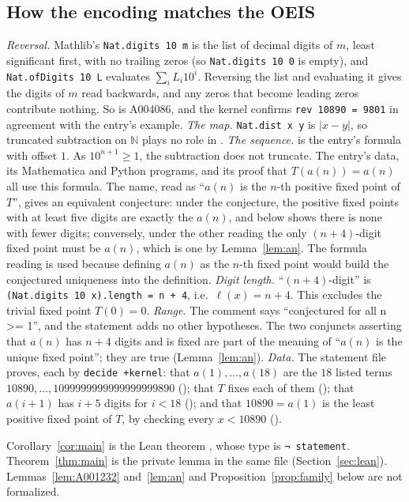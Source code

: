 \documentclass[11pt]{amsart}
\theoremstyle{plain}
\theoremstyle{definition}
\newcommand{\N}{\mathbb{N}}
\newcommand{\len}{\ell}
\begin{document}
\subsection{How the encoding matches the OEIS}
\emph{Reversal.} Mathlib's \texttt{Nat.digits 10 m} is the list of decimal digits of $m$, least significant first, with no trailing zeros (so \texttt{Nat.digits 10 0} is empty), and \texttt{Nat.ofDigits 10 L} evaluates $\sum_i L_i10^i$. Reversing the list and evaluating it gives the digits of $m$ read backwards, and any zeros that become leading zeros contribute nothing. So  is A004086, and the kernel confirms \texttt{rev 10890 = 9801} in agreement with the entry's example.
\emph{The map.} \texttt{Nat.dist x y} is $|x-y|$, so truncated subtraction on $\N$ plays no role in .
\emph{The sequence.}  is the entry's formula with offset $1$. As $10^{n+1}\ge1$, the subtraction does not truncate. The entry's data, its Mathematica and Python programs, and its proof that $T(a(n))=a(n)$ all use this formula. The name, read as ``$a(n)$ is the $n$-th positive fixed point of $T$'', gives an equivalent conjecture: under the conjecture, the positive fixed points with at least five digits are exactly the $a(n)$, and  below shows there is none with fewer digits; conversely, under the other reading the only $(n+4)$-digit fixed point must be $a(n)$, which is one by Lemma~\ref{lem:an}. The formula reading is used because defining $a(n)$ as the $n$-th fixed point would build the conjectured uniqueness into the definition.
\emph{Digit length.} ``$(n+4)$-digit'' is \texttt{(Nat.digits 10 x).length = n + 4}, i.e.\ $\len(x)=n+4$. This excludes the trivial fixed point $T(0)=0$.
\emph{Range.} The comment says ``conjectured for all n >= 1'', and the statement adds no other hypotheses. The two conjuncts asserting that $a(n)$ has $n+4$ digits and is fixed are part of the meaning of ``$a(n)$ is the unique fixed point''; they are true (Lemma~\ref{lem:an}).
\emph{Data.} The statement file proves, each by \texttt{decide +kernel}: that $a(1),\dots,a(18)$ are the $18$ listed terms $10890,\dots,1099999999999999999890$ (); that $T$ fixes each of them (); that $a(i+1)$ has $i+5$ digits for $i<18$ (); and that $10890=a(1)$ is the least positive fixed point of $T$, by checking every $x<10890$ ().

Corollary~\ref{cor:main} is the Lean theorem , whose type is \texttt{¬ statement}. Theorem~\ref{thm:main} is the private lemma  in the same file (Section~\ref{sec:lean}). Lemmas~\ref{lem:A001232} and~\ref{lem:an} and Proposition~\ref{prop:family} below are not formalized.
\end{document}

